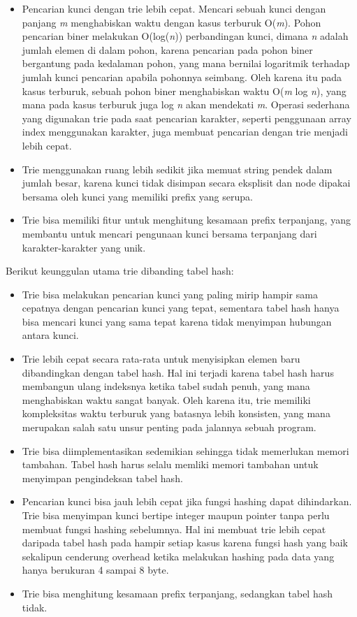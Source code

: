 \begin{itemize}
	\item Pencarian kunci dengan trie lebih cepat. Mencari sebuah kunci dengan panjang \textit{m} menghabiskan waktu dengan kasus terburuk O(\textit{m}). Pohon pencarian biner melakukan O(log(\textit{n})) perbandingan kunci, dimana \textit{n} adalah jumlah elemen di dalam pohon, karena pencarian pada pohon biner bergantung pada kedalaman pohon, yang mana bernilai logaritmik terhadap jumlah kunci pencarian apabila pohonnya seimbang. Oleh karena itu pada kasus terburuk, sebuah pohon biner menghabiskan waktu O(\textit{m} log \textit{n}), yang mana pada kasus terburuk juga log \textit{n} akan mendekati \textit{m}. Operasi sederhana yang digunakan trie pada saat pencarian karakter, seperti penggunaan array index menggunakan karakter, juga membuat pencarian dengan trie menjadi lebih cepat.
	\item Trie menggunakan ruang lebih sedikit jika memuat string pendek dalam jumlah besar, karena kunci tidak disimpan secara eksplisit dan node dipakai bersama oleh kunci yang memiliki prefix yang serupa.
	\item Trie bisa memiliki fitur untuk menghitung kesamaan prefix terpanjang, yang membantu untuk mencari pengunaan kunci bersama terpanjang dari karakter-karakter yang unik.
\end{itemize}

Berikut keunggulan utama trie dibanding tabel hash:

\begin{itemize}
	\item Trie bisa melakukan pencarian kunci yang paling mirip hampir sama cepatnya dengan pencarian kunci yang tepat, sementara tabel hash hanya bisa mencari kunci yang sama tepat karena tidak menyimpan hubungan antara kunci.
	\item Trie lebih cepat secara rata-rata untuk menyisipkan elemen baru dibandingkan dengan tabel hash. Hal ini terjadi karena tabel hash harus membangun ulang indeksnya ketika tabel sudah penuh, yang mana menghabiskan waktu sangat banyak. Oleh karena itu, trie memiliki kompleksitas waktu terburuk yang batasnya lebih konsisten, yang mana merupakan salah satu unsur penting pada jalannya sebuah program.
	\item Trie bisa diimplementasikan sedemikian sehingga tidak memerlukan memori tambahan. Tabel hash harus selalu memliki memori tambahan untuk menyimpan pengindeksan tabel hash.
	\item Pencarian kunci bisa jauh lebih cepat jika fungsi hashing dapat dihindarkan. Trie bisa menyimpan kunci bertipe integer maupun pointer tanpa perlu membuat fungsi hashing sebelumnya. Hal ini membuat trie lebih cepat daripada tabel hash pada hampir setiap kasus karena fungsi hash yang baik sekalipun cenderung overhead ketika melakukan hashing pada data yang hanya berukuran 4 sampai 8 byte.
	\item Trie bisa menghitung kesamaan prefix terpanjang, sedangkan tabel hash tidak.
\end{itemize}